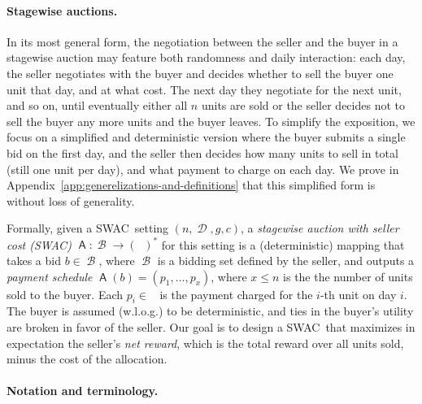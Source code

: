 \documentclass[11pt,letterpaper]{article}
\newcommand{\swac}{SWAC\xspace}
\newcommand{\reals}{\mathbb{R}}
\DeclareMathOperator{\preals}{\reals_{\geq0}}
\DeclareMathOperator{\A}{\auc{A}}
\DeclareMathOperator{\B}{\mathcal{B}}
\DeclareMathOperator{\D}{\mathcal{D}}
\newcommand{\g}{g}
\theoremstyle{plain}
\newcommand{\auc}[1]{\mathsf{#1}}
\begin{document}

\paragraph{Stagewise auctions.}
In its most general form, the negotiation between the seller and the buyer in a stagewise auction may feature both randomness and daily interaction: each day,
the seller negotiates with the buyer and decides whether to sell the buyer
one unit that day, and at what cost.
The next day they negotiate for the next unit, and so on,
until eventually either all $n$ units are sold or the seller decides not to sell the buyer any more units and the buyer leaves.
To simplify the exposition, we focus on a simplified and deterministic
version where the buyer submits a single bid on the first day,
and the seller then decides how many units
to sell in total (still one unit per day), and what payment to charge on each day.
We prove in Appendix~\ref{app:generelizations-and-definitions} that this simplified form is without loss of generality.

Formally, given a \swac\ setting $(n,\D,\g,c)$,
a \emph{stagewise auction with seller cost (\swac)} $\A:\B\rightarrow \left(\preals\right)^\ast$
for this setting
is a (deterministic) mapping that takes a bid $b\in \B$, where $\B$ is a bidding set defined by the seller, and outputs a
\emph{payment schedule} $\A(b) = (p_1, \ldots,p_x)$,
where $x \leq n$ is the the number of units sold to the buyer.
Each $p_i \in \preals$ is the payment charged for the $i$-th unit on day $i$.
The buyer 
is assumed (w.l.o.g.) to be deterministic,
and
ties in the buyer's utility are broken in favor of the seller.
Our goal is to design a \swac\ that maximizes in expectation the seller's \emph{net reward}, which is the total reward over all units sold, minus the cost of the allocation.



\paragraph{Notation and terminology.}
\end{document}
